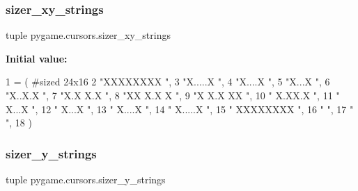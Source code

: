 \subsubsection{\texorpdfstring{sizer\+\_\+xy\+\_\+strings}{sizer\_xy\_strings}}
{\footnotesize\ttfamily tuple pygame.\+cursors.\+sizer\+\_\+xy\+\_\+strings}

{\bfseries Initial value\+:}
\begin{DoxyCode}
1 =  (               \textcolor{comment}{#sized 24x16}
2  \textcolor{stringliteral}{"XXXXXXXX                "},
3  \textcolor{stringliteral}{"X.....X                 "},
4  \textcolor{stringliteral}{"X....X                  "},
5  \textcolor{stringliteral}{"X...X                   "},
6  \textcolor{stringliteral}{"X..X.X                  "},
7  \textcolor{stringliteral}{"X.X X.X                 "},
8  \textcolor{stringliteral}{"XX   X.X    X           "},
9  \textcolor{stringliteral}{"X     X.X  XX           "},
10  \textcolor{stringliteral}{"       X.XX.X           "},
11  \textcolor{stringliteral}{"        X...X           "},
12  \textcolor{stringliteral}{"        X...X           "},
13  \textcolor{stringliteral}{"       X....X           "},
14  \textcolor{stringliteral}{"      X.....X           "},
15  \textcolor{stringliteral}{"     XXXXXXXX           "},
16  \textcolor{stringliteral}{"                        "},
17  \textcolor{stringliteral}{"                        "},
18 )
\end{DoxyCode}
\mbox{\label{namespacepygame_1_1cursors_a1e9668d9192c520351b6fc6ea6aeb1ab}} 
\subsubsection{\texorpdfstring{sizer\+\_\+y\+\_\+strings}{sizer\_y\_strings}}
{\footnotesize\ttfamily tuple pygame.\+cursors.\+sizer\+\_\+y\+\_\+strings}

